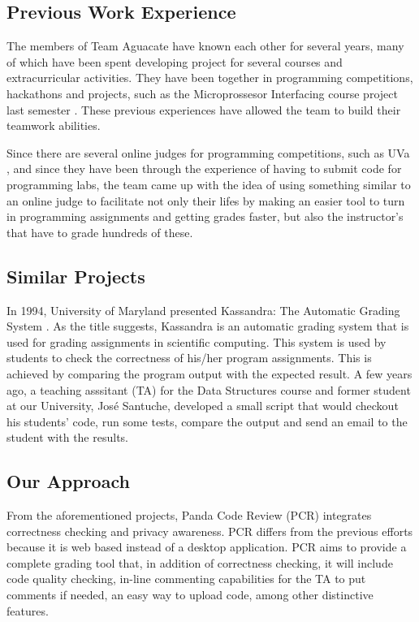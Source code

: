 
\subsection{Previous Work Experience}
The members of Team Aguacate have known each other for several years, many of which have been spent developing project for several courses and extracurricular activities. They have been together in programming competitions, hackathons and projects, such as the Microprossesor Interfacing course project last semester \cite{Micro2}. These previous experiences have allowed the team to build their teamwork abilities.

Since there are several online judges for programming competitions, such as UVa \cite{UVA}, and since they have been through the experience of having to submit code for programming labs, the team came up with the idea of using something similar to an online judge to facilitate not only their lifes by making an easier tool to turn in programming assignments and getting grades faster, but also the instructor's that have to grade hundreds of these.

\subsection{Similar Projects}

In 1994, University of Maryland presented Kassandra: The Automatic Grading System \cite{Matt1994}. As the title suggests, Kassandra is an automatic grading system that is used for grading assignments in scientific computing. This system is used by students to check the correctness of his/her program assignments. This is achieved by comparing the program output with the expected result. A few years ago, a teaching asssitant (TA) for the Data Structures course and former student at our University, José Santuche, developed a small script that would checkout his students' code, run some tests, compare the output and send an email to the student with the results.

\subsection{Our Approach}

From the aforementioned projects, Panda Code Review (PCR) integrates correctness checking and privacy awareness.  PCR differs from the previous efforts because it is web based instead of a desktop application. PCR aims to provide a complete grading tool that, in addition of correctness checking, it will include code quality checking, in-line commenting capabilities for the TA to put comments if needed, an easy way to upload code, among other distinctive features.

